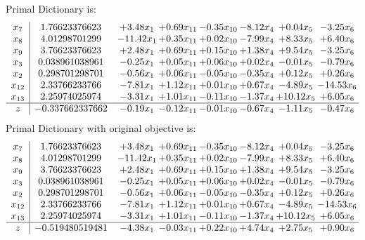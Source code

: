 \documentclass[8pt]{article}
\begin{document}
Primal Dictionary is:
\[\begin{array}{c| c c@{\hskip 2pt} c@{\hskip 2pt} c@{\hskip 2pt} c@{\hskip 2pt} c@{\hskip 2pt} c@{\hskip 2pt} }
 x_{7}   &  1.76623376623 & +  3.48 x_{1} & +  0.69 x_{11} & -0.35 x_{10} & -8.12 x_{4} & +  0.04 x_{5} & -3.25 x_{6}\\
 x_{8}   &  4.01298701299 & -11.42 x_{1} & +  0.35 x_{11} & +  0.02 x_{10} & -7.99 x_{4} & +  8.33 x_{5} & +  6.40 x_{6}\\
 x_{9}   &  3.76623376623 & +  2.48 x_{1} & +  0.69 x_{11} & +  0.15 x_{10} & +  1.38 x_{4} & +  9.54 x_{5} & -3.25 x_{6}\\
 x_{3}   &  0.038961038961 & -0.25 x_{1} & +  0.05 x_{11} & +  0.06 x_{10} & +  0.02 x_{4} & -0.01 x_{5} & -0.79 x_{6}\\
 x_{2}   &  0.298701298701 & -0.56 x_{1} & +  0.06 x_{11} & -0.05 x_{10} & -0.35 x_{4} & +  0.12 x_{5} & +  0.26 x_{6}\\
 x_{12}   &  2.33766233766 & -7.81 x_{1} & +  1.12 x_{11} & +  0.01 x_{10} & +  0.67 x_{4} & -4.89 x_{5} & -14.53 x_{6}\\
 x_{13}   &  2.25974025974 & -3.31 x_{1} & +  1.01 x_{11} & -0.11 x_{10} & -1.37 x_{4} & + 10.12 x_{5} & +  6.05 x_{6}\\
\hline
z    &  -0.337662337662 & -0.19 x_{1} & -0.12 x_{11} & -0.01 x_{10} & -0.67 x_{4} & -1.11 x_{5} & -0.47 x_{6}\\
\end{array}\]
Primal Dictionary with original objective is:
\[\begin{array}{c| c c@{\hskip 2pt} c@{\hskip 2pt} c@{\hskip 2pt} c@{\hskip 2pt} c@{\hskip 2pt} c@{\hskip 2pt} }
 x_{7}   &  1.76623376623 & +  3.48 x_{1} & +  0.69 x_{11} & -0.35 x_{10} & -8.12 x_{4} & +  0.04 x_{5} & -3.25 x_{6}\\
 x_{8}   &  4.01298701299 & -11.42 x_{1} & +  0.35 x_{11} & +  0.02 x_{10} & -7.99 x_{4} & +  8.33 x_{5} & +  6.40 x_{6}\\
 x_{9}   &  3.76623376623 & +  2.48 x_{1} & +  0.69 x_{11} & +  0.15 x_{10} & +  1.38 x_{4} & +  9.54 x_{5} & -3.25 x_{6}\\
 x_{3}   &  0.038961038961 & -0.25 x_{1} & +  0.05 x_{11} & +  0.06 x_{10} & +  0.02 x_{4} & -0.01 x_{5} & -0.79 x_{6}\\
 x_{2}   &  0.298701298701 & -0.56 x_{1} & +  0.06 x_{11} & -0.05 x_{10} & -0.35 x_{4} & +  0.12 x_{5} & +  0.26 x_{6}\\
 x_{12}   &  2.33766233766 & -7.81 x_{1} & +  1.12 x_{11} & +  0.01 x_{10} & +  0.67 x_{4} & -4.89 x_{5} & -14.53 x_{6}\\
 x_{13}   &  2.25974025974 & -3.31 x_{1} & +  1.01 x_{11} & -0.11 x_{10} & -1.37 x_{4} & + 10.12 x_{5} & +  6.05 x_{6}\\
\hline
z    &  -0.519480519481 & -4.38 x_{1} & -0.03 x_{11} & +  0.22 x_{10} & +  4.74 x_{4} & +  2.75 x_{5} & +  0.90 x_{6}\\
\end{array}\]
\end{document}
